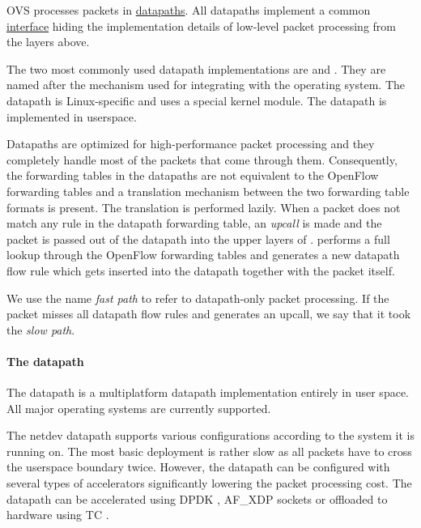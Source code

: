 OVS processes packets in \href{https://github.com/openvswitch/ovs/blob/e90a0727f17f6ad915a32735a8c0b282f2c8cd6f/lib/dpif.h}{datapaths}. All datapaths implement a common \href{https://github.com/openvswitch/ovs/blob/e90a0727f17f6ad915a32735a8c0b282f2c8cd6f/lib/dpif-provider.h\#L107-L117}{interface} hiding the implementation details of low-level packet processing from the layers above.

The two most commonly used datapath implementations are \href{https://github.com/openvswitch/ovs/blob/e90a0727f17f6ad915a32735a8c0b282f2c8cd6f/lib/dpif-netdev.c}{} and \href{https://github.com/openvswitch/ovs/blob/e90a0727f17f6ad915a32735a8c0b282f2c8cd6f/lib/dpif-netlink.c}{}. They are named after the mechanism used for integrating with the operating system. The  datapath is Linux-specific and uses a special kernel module. The  datapath is implemented in userspace.

Datapaths are optimized for high-performance packet processing and they completely handle most of the packets that come through them. Consequently, the forwarding tables in the datapaths are not equivalent to the OpenFlow forwarding tables and a translation mechanism between the two forwarding table formats is present. The translation is performed lazily. When a packet does not match any rule in the datapath forwarding table, an \emph{upcall} is made and the packet is passed out of the datapath into the upper layers of .  performs a full lookup through the OpenFlow forwarding tables and generates a new datapath flow rule which gets inserted into the datapath together with the packet itself.

We use the name \emph{fast path} to refer to datapath-only packet processing. If the packet misses all datapath flow rules and generates an upcall, we say that it took the \emph{slow path}.

\paragraph{The  datapath}
The  datapath is a multiplatform datapath implementation entirely in user space. All major operating systems are currently supported.

The netdev datapath supports various configurations according to the system it is running on. The most basic deployment is rather slow as all packets have to cross the userspace boundary twice. However, the datapath can be configured with several types of accelerators significantly lowering the packet processing cost. The datapath can be accelerated using DPDK \cite{DPDK}, AF\_XDP sockets \cite{XDP} or offloaded to hardware using TC \cite{TCOffload}.

